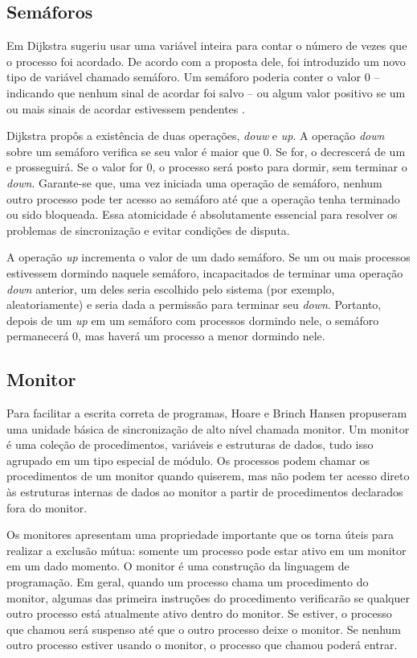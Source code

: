 \subsection{Semáforos}

Em Dijkstra sugeriu usar uma variável inteira para contar o número de vezes que o 
processo foi acordado. De acordo com a proposta dele, foi introduzido um novo tipo de 
variável chamado semáforo. Um semáforo poderia conter o valor 0 – indicando que nenhum 
sinal de acordar foi salvo – ou algum valor positivo se um ou mais sinais de acordar 
estivessem pendentes \cite{TANE}.

Dijkstra propôs a existência de duas operações,  \textit{douw} e \textit{up}. A operação \textit{down} sobre um 
semáforo verifica se seu valor é maior que 0. Se for, o decrescerá de um e prosseguirá. 
Se o valor for 0, o processo será posto para dormir, sem terminar o \textit{down}. Garante-se que, 
uma vez iniciada uma operação de semáforo, nenhum outro processo pode ter acesso ao 
semáforo até que a operação tenha terminado ou sido bloqueada. Essa atomicidade é 
absolutamente essencial para resolver os problemas de sincronização e evitar condições 
de disputa.

A operação \textit{up} incrementa o valor de um dado semáforo. Se um ou mais processos estivessem 
dormindo naquele semáforo, incapacitados de terminar uma operação \textit{down} anterior, um deles 
seria escolhido pelo sistema (por exemplo, aleatoriamente) e seria dada a permissão para 
terminar seu \textit{down}. Portanto, depois de um \textit{up} em um semáforo com processos dormindo nele, 
o semáforo permanecerá 0, mas haverá um processo a menor dormindo nele.

\subsection{Monitor}

Para facilitar a escrita correta de programas, Hoare e Brinch Hansen propuseram uma unidade 
básica de sincronização de alto nível chamada monitor.  Um monitor é uma coleção de procedimentos, 
variáveis e estruturas de dados, tudo isso agrupado em um tipo especial de módulo. Os processos 
podem chamar os procedimentos de um monitor quando quiserem, mas não podem ter acesso direto às 
estruturas internas de dados ao monitor a partir de procedimentos declarados fora do monitor.

Os monitores apresentam uma propriedade importante que os torna úteis para realizar a exclusão mútua: 
somente um processo pode estar ativo em um monitor em um dado momento. O monitor é uma construção da 
linguagem de programação. Em geral, quando um processo chama um procedimento do monitor, algumas das 
primeira instruções do procedimento verificarão  se qualquer outro processo está atualmente ativo 
dentro do monitor. Se estiver, o processo que chamou será suspenso até que o outro processo deixe o 
monitor. Se nenhum outro processo estiver usando o monitor, o processo que chamou poderá entrar.

